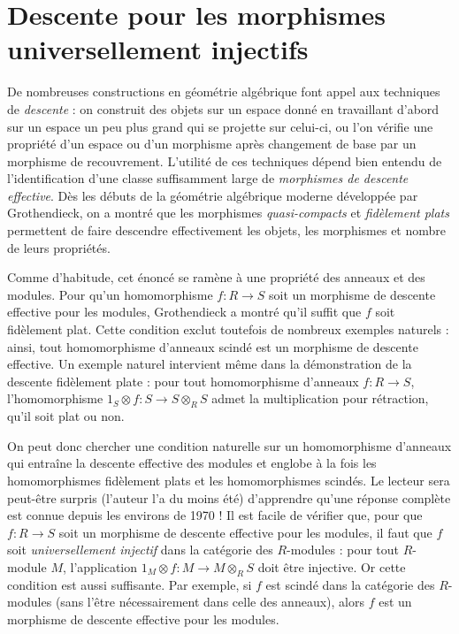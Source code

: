 \section{Descente pour les morphismes universellement injectifs}
\label{section-descent-universally-injective}

\noindent
De nombreuses constructions en géométrie algébrique font appel aux techniques
de {\it descente} : on construit des objets sur un espace donné en travaillant
d'abord sur un espace un peu plus grand qui se projette sur celui-ci,
ou l'on vérifie une propriété d'un espace ou d'un morphisme après
changement de base par un morphisme de recouvrement.
L'utilité de ces techniques dépend bien entendu de l'identification
d'une classe suffisamment large de {\it morphismes de descente effective}.
Dès les débuts de la géométrie algébrique moderne développée par Grothendieck,
on a montré que les morphismes {\it quasi-compacts} et {\it fidèlement plats}
permettent de faire descendre effectivement les objets, les morphismes
et nombre de leurs propriétés.

\medskip\noindent
Comme d'habitude, cet énoncé se ramène à une propriété des anneaux et des modules.
Pour qu'un homomorphisme $f: R \to S$ soit un morphisme de descente effective
pour les modules, Grothendieck a montré qu'il suffit que $f$ soit fidèlement plat.
Cette condition exclut toutefois de nombreux exemples naturels :
ainsi, tout homomorphisme d'anneaux scindé est un morphisme de descente effective.
Un exemple naturel intervient même dans la démonstration de la descente
fidèlement plate : pour tout homomorphisme d'anneaux $f: R \to S$,
l'homomorphisme $1_S \otimes f: S \to S \otimes_R S$
admet la multiplication pour rétraction, qu'il soit plat ou non.

\medskip\noindent
On peut donc chercher une condition naturelle sur un homomorphisme d'anneaux
qui entraîne la descente effective des modules et englobe à la fois
les homomorphismes fidèlement plats et les homomorphismes scindés.
Le lecteur sera peut-être surpris (l'auteur l'a du moins été)
d'apprendre qu'une réponse complète est connue depuis les environs de 1970 !
Il est facile de vérifier que, pour que $f: R \to S$ soit un morphisme
de descente effective pour les modules, il faut que $f$ soit
{\it universellement injectif} dans la catégorie des $R$-modules :
pour tout $R$-module $M$, l'application
$1_M  \otimes f: M \to M \otimes_R S$ doit être injective.
Or cette condition est aussi suffisante.
Par exemple, si $f$ est scindé dans la catégorie des $R$-modules
(sans l'être nécessairement dans celle des anneaux),
alors $f$ est un morphisme de descente effective pour les modules.

